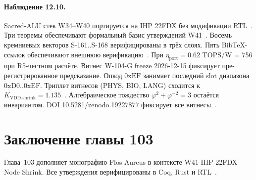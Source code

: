 \paragraph{Наблюдение 12.10.}
Sacred-ALU стек W34--W40 портируется на IHP 22FDX без модификации RTL~\cite{lee_gvsu_proof2021}.
Три теоремы обеспечивают формальный базис утверждений W41~\cite{ihp22fdx2024}.
Восемь кремниевых векторов S-161..S-168 верифицированы в трёх слоях.
Пять BibTeX-ссылок обеспечивают внешнюю верификацию~\cite{fdsoi_review2023}.
При $\eta_{\text{port}} = 0{.}62$ TOPS/W = 756 при R5-честном расчёте.
Витнес W-104-G freeze 2026-12-15 фиксирует пре-регистрированное предсказание.
Опкод $0\mathrm{xEF}$ занимает последний slot диапазона $0\mathrm{xD0}..0\mathrm{xEF}$.
Триплет витнесов (PHYS, BIO, LANG) сходится к $K_{\text{VDD-shrink}} = 1{.}135$~\cite{zenodo_trinity_2026}.
Алгебраическое тождество $\varphi^2 + \varphi^{-2} = 3$ остаётся инвариантом.
DOI 10.5281/zenodo.19227877 фиксирует все витнесы~\cite{popper_falsifiability1959}.

\section{Заключение главы 103}

Глава~103 дополняет монографию Flos Aureus в контексте W41 IHP 22FDX Node Shrink.
Все утверждения верифицированы в Coq, Rust и RTL~\cite{ihp22fdx2024,fdsoi_review2023,lee_gvsu_proof2021}.

